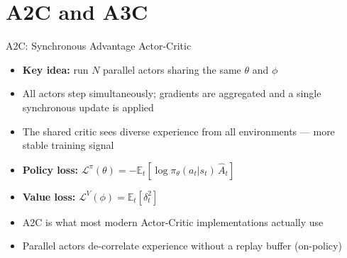 \section{A2C and A3C}
\begin{frame}{A2C: Synchronous Advantage Actor-Critic}
\begin{itemize}
    \item \textbf{Key idea:} run $N$ parallel actors sharing the same $\theta$ and $\phi$
    \item All actors step simultaneously; gradients are aggregated and a single synchronous update is applied
    \item The shared critic sees diverse experience from all environments --- more stable training signal
    \vspace{0.5em}
    \item \textbf{Policy loss:} $\mathcal{L}^{\pi}(\theta) = -\mathbb{E}_t\!\left[\log \pi_\theta(a_t|s_t)\, \hat{A}_t\right]$
    \item \textbf{Value loss:} $\mathcal{L}^{V}(\phi) = \mathbb{E}_t\!\left[\delta_t^2\right]$
    \vspace{0.5em}
    \item A2C is what most modern Actor-Critic implementations actually use
    \item Parallel actors de-correlate experience without a replay buffer (on-policy)
\end{itemize}
\end{frame}
